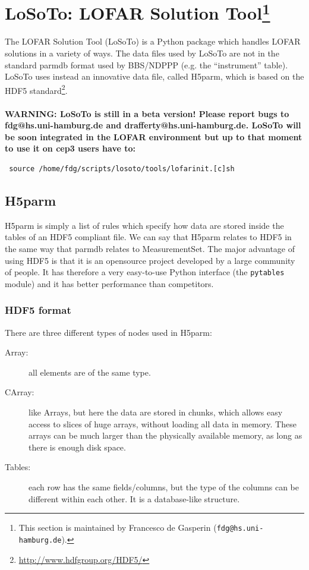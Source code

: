\documentclass[]{article}
\def \losoto {LoSoTo}
\begin{document}
\section[LoSoTo: LOFAR Solution Tool]{\losoto: LOFAR Solution Tool\footnote{This section is maintained by Francesco de Gasperin ({\tt fdg@hs.uni-hamburg.de}).}}
\label{losoto}

The LOFAR Solution Tool (\losoto{}) is a Python package which handles LOFAR solutions in a variety of ways. The data files used by \losoto{} are not in the standard parmdb format used by BBS/NDPPP (e.g. the ``instrument'' table). \losoto{} uses instead an innovative data file, called H5parm, which is based on the HDF5 standard\footnote{\url{http://www.hdfgroup.org/HDF5/}}.
\\
\\
\textbf{WARNING: \losoto{} is still in a beta version! Please report bugs to fdg@hs.uni-hamburg.de and drafferty@hs.uni-hamburg.de. \losoto{} will be soon integrated in the LOFAR environment but up to that moment to use it on cep3 users have to:}
\begin{verbatim}
 source /home/fdg/scripts/losoto/tools/lofarinit.[c]sh
\end{verbatim}

\subsection{H5parm}
\label{losoto:h5parm}

H5parm is simply a list of rules which specify how data are stored inside the tables of an HDF5 compliant file. We can say that H5parm relates to HDF5 in the same way that parmdb relates to MeasurementSet. The major advantage of using HDF5 is that it is an opensource project developed by a large community of people. It has therefore a very easy-to-use Python interface (the \texttt{pytables} module) and it has better performance than competitors.

\subsubsection{HDF5 format}
\label{losoto:HDF5}

There are three different types of nodes used in H5parm:
\begin{description}
 \item[Array:] all elements are of the same type.
 \item[CArray:] like Arrays, but here the data are stored in chunks, which allows easy access to
slices of huge arrays, without loading all data in memory. These arrays can be much
larger than the physically available memory, as long as there is enough disk space.
 \item[Tables:] each row has the same fields/columns, but the type of the columns can be different within each other. It is a database-like structure.
\end{description}
\end{document}
